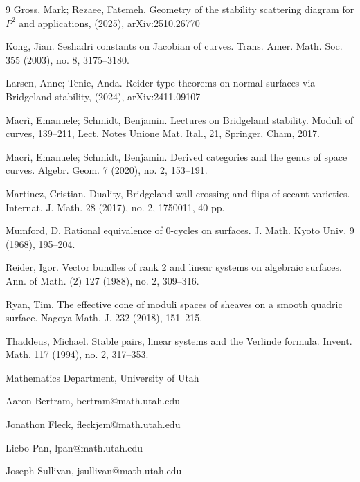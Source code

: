 \documentclass{amsart}
\begin{document}
\begin{thebibliography}{9}
 Gross, Mark; Rezaee, Fatemeh. Geometry of the stability scattering diagram for $P^2$ and applications, (2025), arXiv:2510.26770

  Kong, Jian. Seshadri constants on Jacobian of curves. Trans. Amer. Math. Soc. 355 (2003), no. 8, 3175–3180. 

 Larsen, Anne; Tenie, Anda. Reider-type theorems on normal surfaces via Bridgeland stability, (2024), arXiv:2411.09107 

 Macrì, Emanuele; Schmidt, Benjamin. Lectures on Bridgeland stability. Moduli of curves, 139–211, Lect. Notes Unione Mat. Ital., 21, Springer, Cham, 2017.

 Macrì, Emanuele; Schmidt, Benjamin. Derived categories and the genus of space curves. Algebr. Geom. 7 (2020), no. 2, 153–191. 

 Martinez, Cristian. Duality, Bridgeland wall-crossing and flips of secant varieties. Internat. J. Math. 28 (2017), no. 2, 1750011, 40 pp.

 Mumford, D. Rational equivalence of 0-cycles on surfaces. J. Math. Kyoto Univ. 9 (1968), 195–204.

 Reider, Igor. Vector bundles of rank 2 and linear systems on algebraic surfaces. Ann. of Math. (2) 127 (1988), no. 2, 309–316.

 Ryan, Tim. The effective cone of moduli spaces of sheaves on a smooth quadric surface. Nagoya Math. J. 232 (2018), 151–215.

 Thaddeus, Michael. Stable pairs, linear systems and the Verlinde formula. Invent. Math. 117 (1994), no. 2, 317–353.


\end{thebibliography}

\medskip

\nt Mathematics Department, University of Utah

\medskip

\nt Aaron Bertram, bertram@math.utah.edu

\nt Jonathon Fleck, fleckjem@math.utah.edu

\nt Liebo Pan, lpan@math.utah.edu

\nt Joseph Sullivan, jsullivan@math.utah.edu
\end{document}
